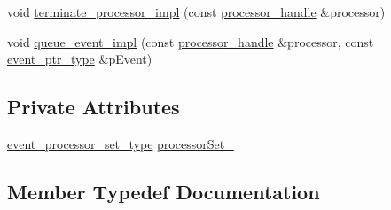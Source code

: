 \begin{DoxyCompactItemize}
\item 
void \mbox{\hyperlink{classboost_1_1statechart_1_1processor__container_a883cf537f7ae021aa79c8614f993f442}{terminate\+\_\+processor\+\_\+impl}} (const \mbox{\hyperlink{classboost_1_1statechart_1_1processor__container_a82ebbffaed81d7b99119ae0e892f6411}{processor\+\_\+handle}} \&processor)
\item 
void \mbox{\hyperlink{classboost_1_1statechart_1_1processor__container_ad09f73c626dbd09da54efef6e00ca9c5}{queue\+\_\+event\+\_\+impl}} (const \mbox{\hyperlink{classboost_1_1statechart_1_1processor__container_a82ebbffaed81d7b99119ae0e892f6411}{processor\+\_\+handle}} \&processor, const \mbox{\hyperlink{classboost_1_1statechart_1_1processor__container_a0123b4f1061816fce5aa2c2ec4c06934}{event\+\_\+ptr\+\_\+type}} \&p\+Event)
\end{DoxyCompactItemize}
\subsection*{Private Attributes}
\begin{DoxyCompactItemize}
\item 
\mbox{\hyperlink{classboost_1_1statechart_1_1processor__container_a34f8c87b6b4f8a8620c0bc6b124d0c77}{event\+\_\+processor\+\_\+set\+\_\+type}} \mbox{\hyperlink{classboost_1_1statechart_1_1processor__container_a5d971d1e7d4745e2c5ffd421aa13291a}{processor\+Set\+\_\+}}
\end{DoxyCompactItemize}


\subsection{Member Typedef Documentation}
\mbox{\label{classboost_1_1statechart_1_1processor__container_a34f8c87b6b4f8a8620c0bc6b124d0c77}} 
